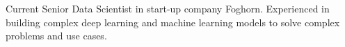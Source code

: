 

\begin{cvparagraph}

Current Senior Data Scientist in start-up company Foghorn. Experienced in building complex deep learning and machine learning models to 
solve complex problems and use cases.
\end{cvparagraph}
